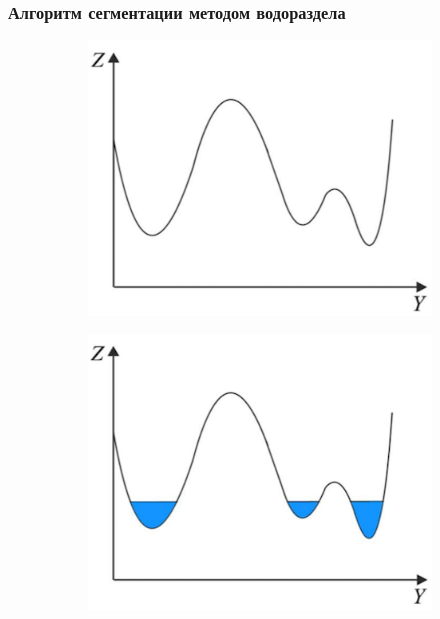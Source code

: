\documentclass[t]{beamer}
\begin{document}
\begin{frame}
	\frametitle{Алгоритм сегментации методом водораздела}
	\vspace*{0.7cm}
	\begin{figure}[ht!]
		\begin{subfigure}{0.32\textwidth}
			\centering
			\includegraphics[width = \textwidth]{image/WaterShed1}
			\caption{}
		\end{subfigure}
		\begin{subfigure}{0.32\textwidth}
			\centering
			\includegraphics[width = \textwidth]{image/WaterShed2}
			\caption{}
		\end{subfigure}

\end{figure}
\end{frame}
\end{document}
